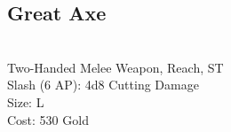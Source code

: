 \subsection{Great Axe}\label{weapon:greatAxe}\\
Two-Handed Melee Weapon,  Reach, ST\\
Slash (6 AP): 4d8 Cutting Damage\\
Size: L\\
Cost: 530 Gold\\